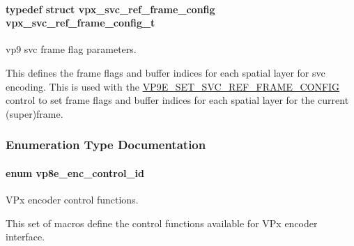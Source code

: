 \paragraph[{\texorpdfstring{vpx\+\_\+svc\+\_\+ref\+\_\+frame\+\_\+config\+\_\+t}{vpx_svc_ref_frame_config_t}}]{\setlength{\rightskip}{0pt plus 5cm}typedef struct {\bf vpx\+\_\+svc\+\_\+ref\+\_\+frame\+\_\+config}  {\bf vpx\+\_\+svc\+\_\+ref\+\_\+frame\+\_\+config\+\_\+t}}\hypertarget{group__vp8__encoder_ga50dc69f110ac04b16478e2db6e89e0db}{}\label{group__vp8__encoder_ga50dc69f110ac04b16478e2db6e89e0db}


vp9 svc frame flag parameters. 

This defines the frame flags and buffer indices for each spatial layer for svc encoding. This is used with the \hyperlink{group__vp8__encoder_gga6deae3d561c838952552c3d3756322ecaa0d822d0d1efa1868ce05d8523a8836b}{V\+P9\+E\+\_\+\+S\+E\+T\+\_\+\+S\+V\+C\+\_\+\+R\+E\+F\+\_\+\+F\+R\+A\+M\+E\+\_\+\+C\+O\+N\+F\+IG} control to set frame flags and buffer indices for each spatial layer for the current (super)frame. 

\subsubsection{Enumeration Type Documentation}
\paragraph[{\texorpdfstring{vp8e\+\_\+enc\+\_\+control\+\_\+id}{vp8e_enc_control_id}}]{\setlength{\rightskip}{0pt plus 5cm}enum {\bf vp8e\+\_\+enc\+\_\+control\+\_\+id}}\hypertarget{group__vp8__encoder_ga6deae3d561c838952552c3d3756322ec}{}\label{group__vp8__encoder_ga6deae3d561c838952552c3d3756322ec}


V\+Px encoder control functions. 

This set of macros define the control functions available for V\+Px encoder interface.

